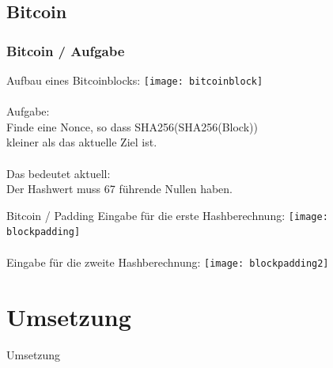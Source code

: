 \documentclass{beamer}
\begin{document}
  \subsection{Bitcoin}
    \begin{frame}
      \frametitle{Bitcoin / Aufgabe}
      Aufbau eines Bitcoinblocks:
      \texttt{[image: bitcoinblock]}\\
      ~\\
      Aufgabe:\\
      Finde eine Nonce, so dass SHA256(SHA256(Block))\\
      kleiner als das aktuelle Ziel ist.\\
      ~\\
      Das bedeutet aktuell:\\
      Der Hashwert muss 67 führende Nullen haben.
    \end{frame}
    \begin{frame}{Bitcoin / Padding}
      Eingabe für die erste Hashberechnung:
      \texttt{[image: blockpadding]}\\
      ~\\
      Eingabe für die zweite Hashberechnung:
      \texttt{[image: blockpadding2]}\\
  \end{frame}
\section{Umsetzung}
  \begin{frame}{}
    \begin{center}
      \Huge Umsetzung
    \end{center}
  \end{frame}
\end{document}
